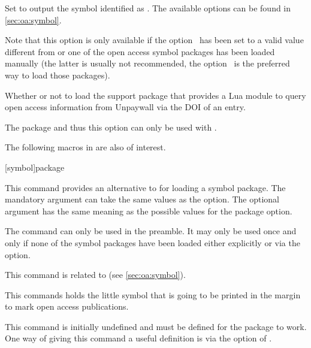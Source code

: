 \documentclass[DIV=9]{scrartcl}
\makeatletter
\let\exltd@pdfbookmark\ltd@pdfbookmark
\def\ltd@pdfbookmark#1#2{%
  \phantomsection\label{exltd@itm@#1}%
  \exltd@pdfbookmark{#1}{#2}}
\makeatother
\begin{document}
\begin{optionlist}
\begingroup
\makeatletter
\def\ltd@pdfbookmark#1#2{%
  \exltd@pdfbookmark{#1}{#2}}
\makeatother
{}
\endgroup

Set  to output the symbol identified as .
The available options can be found in \cref{sec:oa:symbol}.

\begin{warnbox}
Note that this option is only available if the
option~ has been set to a valid value different
from  or one of the open access symbol packages has
been loaded manually (the latter is usually not recommended, the
option~ is the preferred way to load those
packages).
\end{warnbox}


Whether or not to load the support package 
that provides a Lua module to query open access information
from Unpaywall via the DOI of an entry.

\begin{warnbox}
The package  and thus this option
can only be used with \lualatex.
\end{warnbox}
\end{optionlist}

\clearpage
The following macros in  are also of interest.
\begin{ltxsyntax}


[symbol]{package}

This command provides an alternative to  for loading
a symbol package.
The mandatory argument  can take the same values as the
 option.
The optional argument  has the same meaning as the possible values
for the  package option.

The command can only be used in the preamble.
It may only be used once and only if none of the symbol packages have been
loaded either explicitly or via the  option.

This command is related to  (see \cref{sec:oa:symbol}).


This commands holds the little symbol that is going to be printed in the margin
to mark open access publications.

This command is initially undefined and must be defined for the
package to work.
One way of giving this command a useful definition is via the
 option of .
\end{ltxsyntax}
\end{document}
